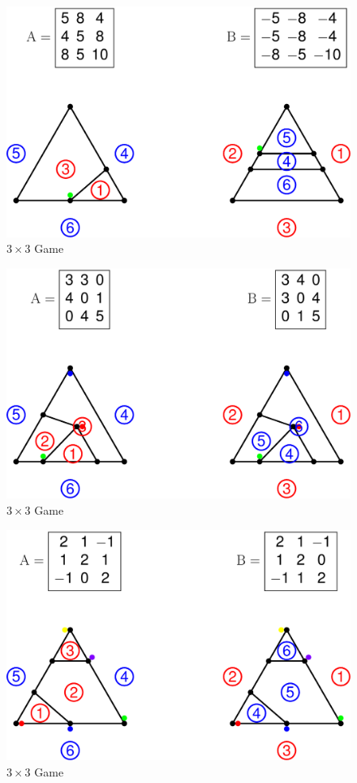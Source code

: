 \begin{figure}[tbh]
    \caption{$3 \times 3$ Game}\label{uniqeq}
    \includegraphics[width=\textwidth]{img/img1.pdf}
\end{figure}

\begin{center}
    \begin{figure}[tbh]
        \caption{$3 \times 3$ Game}\label{oneeq}
        \includegraphics[width=\textwidth]{img/img0.pdf}
    \end{figure}
\end{center}

\begin{figure}[tbh]
    \caption{$3 \times 3$ Game}\label{multeq}
    \includegraphics[width=\textwidth]{img/img2.pdf}
\end{figure}
